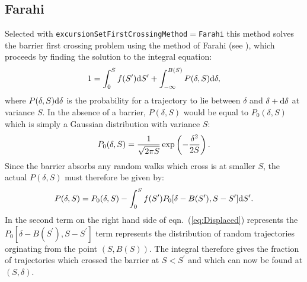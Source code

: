 \subsection{Farahi}

Selected with {\tt excursionSetFirstCrossingMethod}$=${\tt Farahi} this method solves the barrier first crossing problem using the method of Farahi (see \citealt{benson_dark_2012}), which proceeds by finding the solution to the integral equation:
\begin{equation}
  1 =  \int_0^S f(S^\prime){\rm d}S^\prime + \int_{-\infty}^{B(S)} P(\delta,S) {\rm d} \delta,
 \label{eq:OldExcursionMethod}
\end{equation}
where $P(\delta,S) {\rm d} \delta$ is the probability for a trajectory to lie between $\delta$ and $\delta + {\rm d} \delta$ at variance $S$. In the absence of a barrier, $P(\delta,S)$ would be equal to $P_0(\delta,S)$ which is simply a Gaussian distribution with variance $S$:
\begin{equation}
  P_0(\delta,S) = \frac{1}{\sqrt{2 \pi S}} \exp\left(-{\delta^2 \over 2 S}\right).
  \label{eq:Gaussian}
\end{equation}
Since the barrier absorbs any random walks which cross is at smaller $S$, the actual $P(\delta,S)$ must therefore be given by:
\begin{equation}
   P(\delta,S) = P_0(\delta,S) - \int_{0}^{S} f(S^\prime) P_0[\delta - B(S^\prime),S - S^\prime]{\rm d}S^\prime .
 \label{eq:Displaced}
\end{equation}
In the second term on the right hand side of eqn.~(\ref{eq:Displaced}) represents the $P_0[\delta - B(S^\prime),S - S^\prime]$ term represents the distribution of random trajectories orginating from the point $(S,B(S))$. The integral therefore gives the fraction of trajectories which crossed the barrier at $S<S^\prime$ and which can now be found at $(S,\delta)$.

